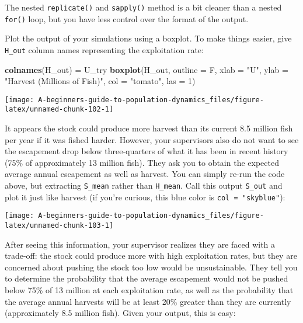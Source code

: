 \documentclass[]{book}
\newenvironment{Shaded}{\begin{snugshade}}{\end{snugshade}}
\newcommand{\DataTypeTok}[1]{\textcolor[rgb]{0.13,0.29,0.53}{#1}}
\newcommand{\DecValTok}[1]{\textcolor[rgb]{0.00,0.00,0.81}{#1}}
\newcommand{\KeywordTok}[1]{\textcolor[rgb]{0.13,0.29,0.53}{\textbf{#1}}}
\newcommand{\NormalTok}[1]{#1}
\newcommand{\StringTok}[1]{\textcolor[rgb]{0.31,0.60,0.02}{#1}}
\begin{document}
The nested \texttt{replicate()} and \texttt{sapply()} method is a bit cleaner than a nested \texttt{for()} loop, but you have less control over the format of the output.

Plot the output of your simulations using a boxplot. To make things easier, give \texttt{H\_out} column names representing the exploitation rate:

\begin{Shaded}
\begin{Highlighting}[]
\KeywordTok{colnames}\NormalTok{(H_out) =}\StringTok{ }\NormalTok{U_try}
\KeywordTok{boxplot}\NormalTok{(H_out, }\DataTypeTok{outline =}\NormalTok{ F,}
        \DataTypeTok{xlab =} \StringTok{"U"}\NormalTok{, }\DataTypeTok{ylab =} \StringTok{"Harvest (Millions of Fish)"}\NormalTok{,}
        \DataTypeTok{col =} \StringTok{"tomato"}\NormalTok{, }\DataTypeTok{las =} \DecValTok{1}\NormalTok{)}
\end{Highlighting}
\end{Shaded}

\begin{center}\texttt{[image: A-beginners-guide-to-population-dynamics\_files/figure-latex/unnamed-chunk-102-1]} \end{center}

It appears the stock could produce more harvest than its current 8.5 million fish per year if it was fished harder. However, your supervisors also do not want to see the escapement drop below three-quarters of what it has been in recent history (75\% of approximately 13 million fish). They ask you to obtain the expected average annual escapement as well as harvest. You can simply re-run the code above, but extracting \texttt{S\_mean} rather than \texttt{H\_mean}. Call this output \texttt{S\_out} and plot it just like harvest (if you're curious, this blue color is \texttt{col\ =\ "skyblue"}):

\begin{center}\texttt{[image: A-beginners-guide-to-population-dynamics\_files/figure-latex/unnamed-chunk-103-1]} \end{center}

After seeing this information, your supervisor realizes they are faced with a trade-off: the stock could produce more with high exploitation rates, but they are concerned about pushing the stock too low would be unsustainable. They tell you to determine the probability that the average escapement would not be pushed below 75\% of 13 million at each exploitation rate, as well as the probability that the average annual harvests will be at least 20\% greater than they are currently (approximately 8.5 million fish). Given your output, this is easy:
\end{document}
